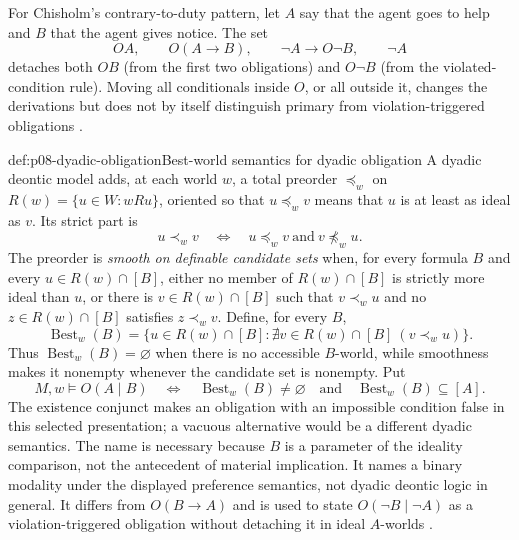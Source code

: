 For Chisholm's contrary-to-duty pattern, let \(A\) say that the agent goes to
help and \(B\) that the agent gives notice.  The set
\[
 OA,\qquad O(A\to B),\qquad \neg A\to O\neg B,\qquad \neg A
\]
detaches both \(OB\) (from the first two obligations) and \(O\neg B\) (from
the violated-condition rule).  Moving all conditionals inside \(O\), or all
outside it, changes the derivations but does not by itself distinguish primary
from violation-triggered obligations \cite{Chisholm1963,McNamara2006}.

\begin{hbdefinition}{def:p08-dyadic-obligation}{Best-world semantics for dyadic obligation}
A dyadic deontic model adds, at each world \(w\), a total preorder
\(\preceq_w\) on
\(R(w)=\{u\in W:wRu\}\), oriented so that
\(u\preceq_w v\) means that \(u\) is at least as ideal as \(v\).  Its strict
part is
\[
 u\prec_w v
 \quad\Longleftrightarrow\quad
 u\preceq_w v\ \text{and}\ v\not\preceq_w u.
\]
The preorder is \emph{smooth on definable candidate sets} when, for every
formula \(B\) and every \(u\in R(w)\cap[B]\), either no member of
\(R(w)\cap[B]\) is strictly more ideal than \(u\), or there is
\(v\in R(w)\cap[B]\) such that \(v\prec_w u\) and no
\(z\in R(w)\cap[B]\) satisfies \(z\prec_w v\).  Define, for every \(B\),
\[
 \operatorname{Best}_w(B)
 =\{u\in R(w)\cap[B]:
       \nexists v\in R(w)\cap[B]\ (v\prec_w u)\}.
\]
Thus \(\operatorname{Best}_w(B)=\varnothing\) when there is no accessible
\(B\)-world, while smoothness makes it nonempty whenever the candidate set is
nonempty.  Put
\[
 M,w\models O(A\mid B)
 \quad\Longleftrightarrow\quad
 \operatorname{Best}_w(B)\ne\varnothing
 \quad\text{and}\quad
 \operatorname{Best}_w(B)\subseteq[A].
\]
The existence conjunct makes an obligation with an impossible condition false
in this selected presentation; a vacuous alternative would be a different
dyadic semantics.
The name is necessary because \(B\) is a parameter of the ideality comparison,
not the antecedent of material implication.  It names a binary modality under
the displayed preference semantics, not dyadic deontic logic in general.  It
differs from \(O(B\to A)\) and is used to state
\(O(\neg B\mid\neg A)\) as a violation-triggered obligation without detaching
it in ideal \(A\)-worlds \cite{Hansson1969}.
\end{hbdefinition}

